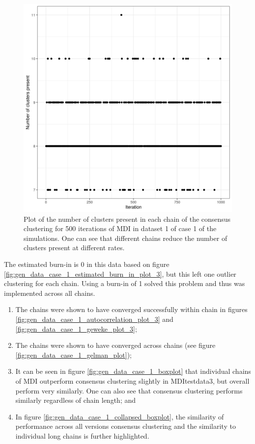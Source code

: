 \documentclass[12pt]{article} %
\begin{document}
	\begin{figure}[!htb]
		\centering
		\includegraphics[scale=0.65]{Images/Gen_data/Case_1/Number_clusters_present_MDItestdata1_consensus_500.png}
		\caption{Plot of the number of clusters present in each chain of the consensus clustering for 500 iterations of MDI in dataset 1 of case 1 of the simulations. One can see that different chains reduce the number of clusters present at different rates.}
		\label{fig:gen_data_case_1_num_clusters_present_con_500}
	\end{figure}

	The estimated burn-in is 0 in this data based on figure \ref{fig:gen_data_case_1_estimated_burn_in_plot_3}, but this left one outlier clustering for each chain. Using a burn-in of 1 solved this problem and thus was implemented across all chains.
	
	\begin{enumerate}
		\item The chains were shown to have converged successfully within chain in figures \ref{fig:gen_data_case_1_autocorrelation_plot_3} and \ref{fig:gen_data_case_1_geweke_plot_3};
		\item The chains were shown to have converged across chains (see figure \ref{fig:gen_data_case_1_gelman_plot});
		\item It can be seen in figure \ref{fig:gen_data_case_1_boxplot} that individual chains of MDI outperform consensus clustering slightly in MDItestdata3, but overall perform very similarly. One can also see that consensus clustering performs similarly regardless of chain length; and
		\item In figure \ref{fig:gen_data_case_1_collapsed_boxplot}, the similarity of performance across all versions consensus clustering and the similarity to individual long chains is further highlighted.
	\end{enumerate}
	
\end{document}
